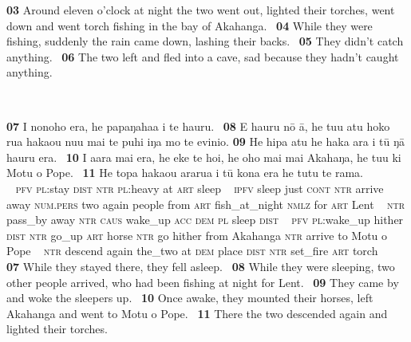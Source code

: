 {\medskip\glt
\textbf{\textup{03}} Around eleven o’clock at night the two went out, lighted their torches, went down and went torch fishing in the bay of Akahanga. ~\textbf{\textup{04}} While they were fishing, suddenly the rain came down, lashing their backs. ~\textbf{\textup{05}} They didn’t catch anything. ~\textbf{\textup{06}} The two left and fled into a cave, sad because they hadn’t caught anything.


~

\bigskip\gll
\textbf{\textup{07}} I nonoho era, he papaŋaha{\ꞌ}a {\ꞌ}i te ha{\ꞌ}uru. ~\textbf{\textup{08}} E ha{\ꞌ}uru nō {\ꞌ}ā, he tu{\ꞌ}u atu hoko rua haka{\ꞌ}ou nu{\ꞌ}u mai te puhi iŋa mo te evinio. \textbf{\textup{09}} He hipa atu he haka {\ꞌ}ara i tū ŋā ha{\ꞌ}uru era. ~\textbf{\textup{10}} I {\ꞌ}a{\ꞌ}ara mai era, he eke te hoi, he oho mai mai {\ꞌ}Akahaŋa, he tu{\ꞌ}u ki Motu o Pope. ~\textbf{\textup{11}} He topa haka{\ꞌ}ou ararua {\ꞌ}i tū kona era he tutu te rama.\\
~ \textsc{pfv} \textsc{pl}:stay \textsc{dist} \textsc{ntr} \textsc{pl}:heavy at \textsc{art} sleep ~ \textsc{ipfv} sleep just \textsc{cont} \textsc{ntr} arrive away \textsc{num.pers} two again people from \textsc{art} fish\_at\_night \textsc{nmlz} for \textsc{art} Lent  ~ \textsc{ntr} pass\_by away \textsc{ntr} \textsc{caus} wake\_up \textsc{acc} \textsc{dem} \textsc{pl} sleep \textsc{dist} ~ \textsc{pfv} \textsc{pl}:wake\_up hither \textsc{dist} \textsc{ntr} go\_up \textsc{art} horse \textsc{ntr} go hither from Akahanga \textsc{ntr} arrive to Motu o Pope ~ \textsc{ntr} descend again the\_two at \textsc{dem} place \textsc{dist} \textsc{ntr} set\_fire \textsc{art} torch\\

\medskip\glt
\textbf{\textup{07}} While they stayed there, they fell asleep. ~\textbf{\textup{08}} While they were sleeping, two other people arrived, who had been fishing at night for Lent. ~\textbf{\textup{09}} They came by and woke the sleepers up. ~\textbf{\textup{10}} Once awake, they mounted their horses, left Akahanga and went to Motu o Pope. ~\textbf{\textup{11}} There the two descended again and lighted their torches.


~

}
